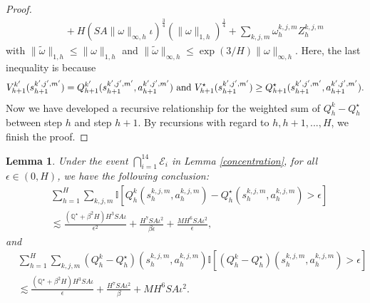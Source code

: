 \documentclass{article}
\newtheorem{lemma}{Lemma}[section]
\begin{document}
\begin{proof}
\begin{align*}
        &\quad + H(SA\|\omega\|_{\infty,h}\iota)^{\frac{3}{4}}(\|\omega\|_{1,h})^{\frac{1}{4}}  +\sum_{k,j,m} \omega_{h}^{k,j,m} Z_{h}^{k,j,m}
    \end{align*}
with $\|\tilde{\omega}\|_{1,h} \leq \|\omega\|_{1,h}$ and $\|\tilde{\omega}\|_{\infty,h} \leq \exp(3/H)\|\omega\|_{\infty,h}$. Here, the last inequality is because
$$V_{h+1}^{k'} (s_{h+1}^{k',j',m'}) = Q_{h+1}^{k'}(s_{h+1}^{k',j',m'}, a_{h+1}^{k',j',m'}) \textnormal{ and } V_{h+1}^{\star} (s_{h+1}^{k',j',m'}) \geq Q_{h+1}^{\star}(s_{h+1}^{k',j',m'}, a_{h+1}^{k',j',m'}).$$
Now we have developed a recursive relationship for the weighted sum of $Q_h^k - Q_h^{\star}$ between step $h$ and step $h+1$. By recursions with regard to $h, h+1,...,H$, we finish the proof.
\end{proof}
\begin{lemma}
\label{gapclipq}
Under the event $\bigcap_{i=1}^{14}\mathcal{E}_i$ in Lemma \ref{concentration}, for all $\epsilon \in (0, H)$, we have the following conclusion:
\begin{align*} 
    &\sum_{h=1}^H \sum_{k,j,m} \mathbb{I} \left [Q_h^k(s_h^{k,j,m}, a_h^{k,j,m}) - Q_h^{\star}(s_h^{k,j,m}, a_h^{k,j,m}) > \epsilon \right]\\
    &\lesssim  \frac{\left(\mathbb{Q}^\star+\beta^2H\right)H^3SA\iota}{\epsilon^2} + \frac{H^7SA\iota^2}{\beta\epsilon}+ \frac{MH^6SA\iota^2}{\epsilon},
\end{align*}
and
\begin{align*} 
   &\sum_{h=1}^H \sum_{k,j,m} \left(Q_h^k - Q_h^{\star}\right)(s_h^{k,j,m}, a_h^{k,j,m}) \mathbb{I}\left[ \left(Q_h^k - Q_h^{\star}\right)(s_h^{k,j,m}, a_h^{k,j,m}) > \epsilon \right] \\
   &\lesssim \frac{\left(\mathbb{Q}^\star+\beta^2H\right)H^3SA \iota}{\epsilon}  + \frac{H^7SA\iota^2}{\beta}+ MH^6SA\iota^2.
\end{align*}
\end{lemma}
\end{document}
